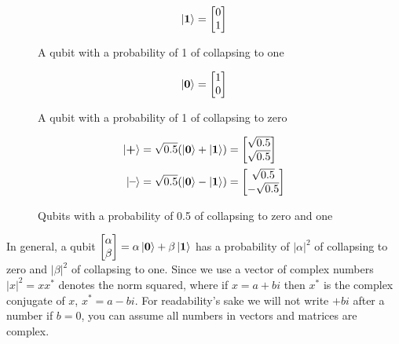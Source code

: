 \newcommand{\qto}{\mathbf{1}}
\newcommand{\qtz}{\mathbf{0}}
\newcommand{\qtp}{\textbf{+}}
\newcommand{\qtm}{\textbf{--}}
\newcommand{\qti}{\mathbf{I}}
\newcommand{\qtr}[1]{\mathbf{R_{#1}}}
\newcommand{\qtx}{\mathbf{X}}
\newcommand{\qth}{\mathbf{H}}
\newcommand{\qtcx}{\mathbf{CX}}
\begin{figure}[H]
    \centering
    \begin{equation*}
        \ket{\qto} =\qo    
    \end{equation*}
    \caption{A qubit with a probability of 1 of collapsing 
    to one}
    \label{fig:q1}
\end{figure}
\begin{figure}[H]
    \centering
    \begin{equation*}
        \ket{\qtz} =\qz
    \end{equation*}
    \caption{A qubit with a probability of 1 of collapsing to zero}
    \label{fig:q0}
\end{figure}
\begin{figure}[H]
    \centering
    \begin{align*}
    \ket{\qtp} &= \sqrt{0.5}(\ket{\qtz} + \ket{\qto}) = \qp\\
    \ket{\qtm} &= \sqrt{0.5}(\ket{\qtz} - \ket{\qto}) = \qm
    \end{align*}
    \caption{Qubits with a probability of 0.5 of collapsing to zero and one}
    \label{fig:q+}
\end{figure}
\noindent
In general, a qubit 
$ 
\begin{bmatrix} 
    \alpha\\ 
    \beta\\ 
\end{bmatrix} 
= \alpha \ket{\qtz} + \beta \ket{\qto} 
$ 
has a probability of $|\alpha|^2$ of collapsing to zero and $|\beta|^2$ of collapsing to one. 
Since we use a vector of complex numbers $|x|^2=xx^*$ denotes the norm squared, where if $x=a+bi$ then $x^*$ is the complex conjugate of $x$, $x^* =a-bi$. 
For readability's sake we will not write $+bi$ after a number if $b=0$, you can assume all numbers in vectors and matrices are complex. 

